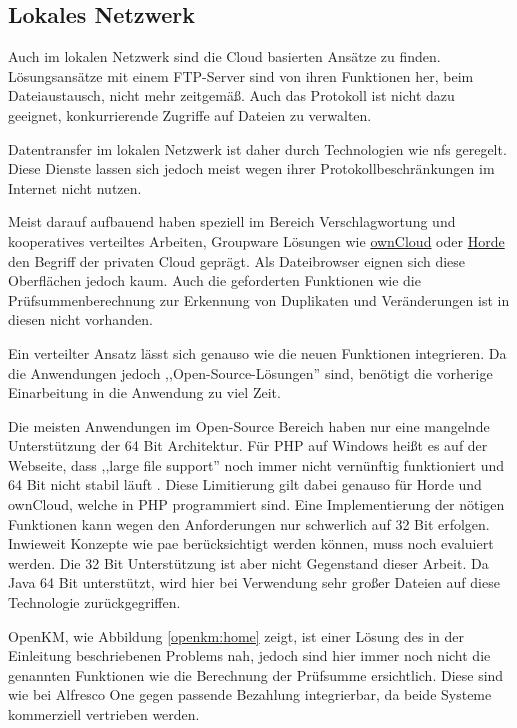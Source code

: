 \documentclass[oneside, ngerman, toc=bibliography,bibliography=totoc,listof=entryprefix, open=right,numbers=noenddot,fontsize=12pt]{scrbook}
\begin{document}
\subsection{Lokales Netzwerk}
Auch im lokalen Netzwerk sind die Cloud basierten Ansätze zu finden. Lösungsansätze mit einem FTP-Server sind von ihren Funktionen her, beim Dateiaustausch, nicht mehr zeitgemäß. Auch das Protokoll ist nicht dazu geeignet, konkurrierende Zugriffe auf Dateien zu verwalten.

Datentransfer im lokalen Netzwerk ist daher durch Technologien wie \acrshort{nfs} geregelt.
Diese Dienste lassen sich jedoch meist wegen ihrer Protokollbeschränkungen im Internet nicht nutzen.

Meist darauf aufbauend haben speziell im Bereich Verschlagwortung und kooperatives verteiltes Arbeiten, Groupware Lösungen wie \href{https://owncloud.org/}{{ownCloud}} oder \href{http://www.horde.org/apps/groupware}{{Horde}} den Begriff der privaten Cloud geprägt. Als Dateibrowser eignen sich diese Oberflächen jedoch kaum. Auch die geforderten Funktionen wie die Prüfsummenberechnung zur Erkennung von Duplikaten und Veränderungen ist in diesen nicht vorhanden.

Ein verteilter Ansatz lässt sich genauso wie die neuen Funktionen integrieren. Da die Anwendungen jedoch ,,Open-Source-Lösungen'' sind, benötigt die vorherige Einarbeitung in die Anwendung zu viel Zeit. 

Die meisten Anwendungen im Open-Source Bereich haben nur eine mangelnde Unterstützung der 64 Bit Architektur. Für PHP auf Windows heißt es auf der Webseite, dass ,,large file support'' noch immer nicht vernünftig funktioniert und 64 Bit nicht stabil läuft \cite{phpw}. Diese Limitierung gilt dabei genauso für Horde und ownCloud, welche in PHP programmiert sind. Eine Implementierung der nötigen Funktionen kann wegen den Anforderungen nur schwerlich auf 32 Bit erfolgen. Inwieweit Konzepte wie \acrfull{pae} berücksichtigt werden können, muss noch evaluiert werden. Die 32 Bit Unterstützung ist aber nicht Gegenstand dieser Arbeit.
Da Java 64 Bit unterstützt, wird hier bei Verwendung sehr großer Dateien auf diese Technologie zurückgegriffen.

{OpenKM}, wie Abbildung \ref{openkm:home} zeigt, ist einer Lösung des in der Einleitung beschriebenen Problems nah, jedoch sind hier immer noch nicht die genannten Funktionen wie die Berechnung der Prüfsumme ersichtlich. Diese sind wie bei  {Alfresco One} gegen passende Bezahlung integrierbar, da beide Systeme kommerziell vertrieben werden.
\end{document}
